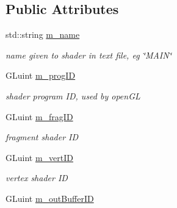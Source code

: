 \subsection*{Public Attributes}
\begin{DoxyCompactItemize}
\item 
\hypertarget{struct_shader_pro_a5f134047e932f52e46d1bde8eccc447c}{std\-::string \hyperlink{struct_shader_pro_a5f134047e932f52e46d1bde8eccc447c}{m\-\_\-name}}\label{struct_shader_pro_a5f134047e932f52e46d1bde8eccc447c}

\begin{DoxyCompactList}\small\item\em name given to shader in text file, eg \char`\"{}\-M\-A\-I\-N\char`\"{} \end{DoxyCompactList}\item 
\hypertarget{struct_shader_pro_a129da0c17bbe478c3e3d53cab7015d02}{G\-Luint \hyperlink{struct_shader_pro_a129da0c17bbe478c3e3d53cab7015d02}{m\-\_\-prog\-I\-D}}\label{struct_shader_pro_a129da0c17bbe478c3e3d53cab7015d02}

\begin{DoxyCompactList}\small\item\em shader program I\-D, used by open\-G\-L \end{DoxyCompactList}\item 
\hypertarget{struct_shader_pro_aef7140b201165a62e77216fd8479f094}{G\-Luint \hyperlink{struct_shader_pro_aef7140b201165a62e77216fd8479f094}{m\-\_\-frag\-I\-D}}\label{struct_shader_pro_aef7140b201165a62e77216fd8479f094}

\begin{DoxyCompactList}\small\item\em fragment shader I\-D \end{DoxyCompactList}\item 
\hypertarget{struct_shader_pro_ab798c7c102d4183fc36392884374aaee}{G\-Luint \hyperlink{struct_shader_pro_ab798c7c102d4183fc36392884374aaee}{m\-\_\-vert\-I\-D}}\label{struct_shader_pro_ab798c7c102d4183fc36392884374aaee}

\begin{DoxyCompactList}\small\item\em vertex shader I\-D \end{DoxyCompactList}\item 
\hypertarget{struct_shader_pro_aedfab2d94289b844c81ec90b94e337b5}{G\-Luint \hyperlink{struct_shader_pro_aedfab2d94289b844c81ec90b94e337b5}{m\-\_\-out\-Buffer\-I\-D}}\label{struct_shader_pro_aedfab2d94289b844c81ec90b94e337b5}


\end{DoxyCompactItemize}
